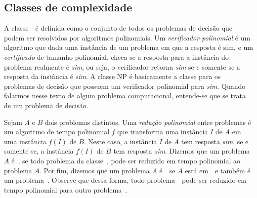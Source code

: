 \subsection{Classes de complexidade}

A classe~\poli~é definida como o conjunto de todos os problemas de decisão que podem ser resolvidos por algoritmos polinomiais. Um \emph{verificador polinomial} é um algoritmo que dada uma instância de um problema em que a resposta é sim, e um \emph{certificado} de tamanho polinomial, checa se a resposta para a instância do problema realmente é \emph{sim}, ou seja, o verificador retorna \emph{sim} se e somente se a resposta da instância é \emph{sim}. A classe NP é basicamente a classe para os problemas de decisão que possuem um verificador polinomial para \emph{sim}. Quando falarmos nesse texto de algum problema computacional, entende-se que se trata de um problema de decisão.

Sejam $A$ e $B$ dois problemas distintos. Uma \emph{redução polinomial} entre problemas é um algoritmo de tempo polinomial $f$ que transforma uma instância $I$ de $A$ em uma instância $f(I)$ de $B$. Neste caso, a instância $I$ de $A$ tem resposta \emph{sim}, se e somente se, a instância $f(I)$ de $B$ tem resposta \emph{sim}. Dizemos que um problema $A$ é~\npd, se todo problema da classe~\np, pode ser reduzido em tempo polinomial ao problema $A$. Por fim, dizemos que um problema $A$ é~\npc~se $A$ está em~\np~e também é um problema~\npd. Observe que dessa forma, todo problema~\npc~pode ser reduzido em tempo polinomial para outro problema~\npc.